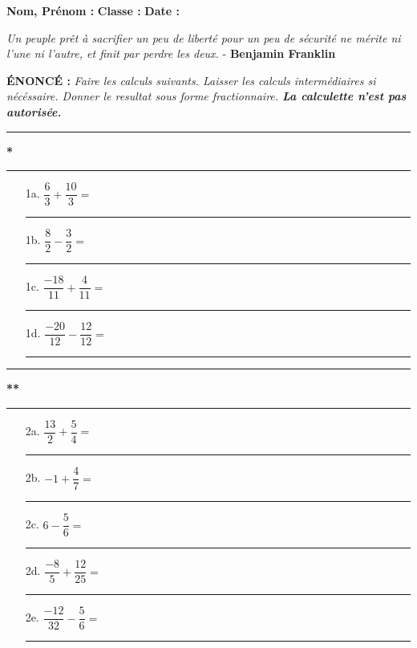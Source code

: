 \documentclass[12pt]{article}
\begin{document}

\textbf{Nom, Prénom :} \hspace{8cm} \textbf{Classe :} \hspace{3cm} \textbf{Date :}

\begin{center}
\textit{Un peuple prêt à sacrifier un peu de liberté pour un peu de sécurité ne mérite ni l'une ni l'autre, et finit par perdre les deux.} - \textbf{Benjamin Franklin}
\end{center}

\textbf{ÉNONCÉ : }
\textit{Faire les calculs suivants. Laisser les calculs intermédiaires si nécéssaire. Donner le resultat sous forme fractionnaire. \textbf{La calculette n'est pas autorisée.}}

\vspace{0.2cm}
\rule{0.5\linewidth}{1pt} \textbf{*} \rule{0.5\linewidth}{1pt}
\vspace{0.2cm}

\begin{enumerate}
\item[1a.] $\dfrac{6}{3}    + \dfrac{10}{3}   =$\\
\rule{\linewidth}{0.5pt}
\item[1b.] $\dfrac{8}{2}    - \dfrac{3}{2}    =$\\
\rule{\linewidth}{0.5pt}
\item[1c.] $\dfrac{-18}{11} + \dfrac{4}{11}    =$\\
\rule{\linewidth}{0.5pt}
\item[1d.] $\dfrac{-20}{12} - \dfrac{12}{12} =$\\
\rule{\linewidth}{0.5pt}
\end{enumerate}

\vspace{0.2cm}
\rule{0.49\linewidth}{1pt} \textbf{**} \rule{0.49\linewidth}{1pt}
\vspace{0.2cm}

\begin{enumerate}
\item[2a.] $\dfrac{13}{2}   + \dfrac{5}{4}   =$\\
\rule{\linewidth}{0.5pt}
\item[2b.] $           -1   + \dfrac{4}{7}   =$\\
\rule{\linewidth}{0.5pt}
\item[2c.] $            6   - \dfrac{5}{6}   =$\\
\rule{\linewidth}{0.5pt}
\item[2d.] $\dfrac{-8}{5}   + \dfrac{12}{25} =$\\
\rule{\linewidth}{0.5pt}
\item[2e.] $\dfrac{-12}{32} - \dfrac{5}{6}   =$\\
\rule{\linewidth}{0.5pt}
\end{enumerate}
\end{document}

